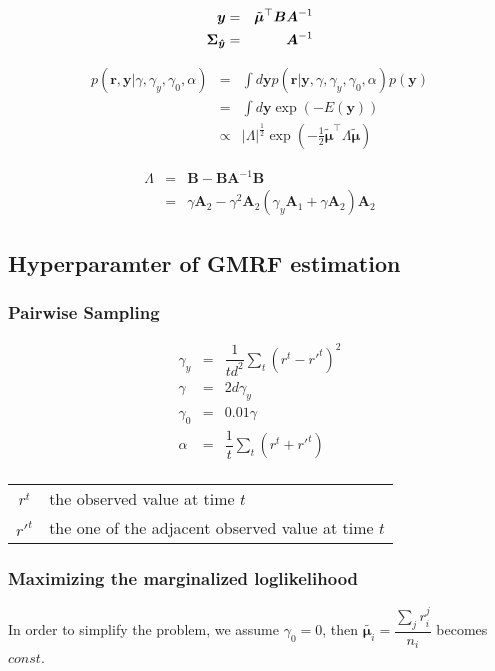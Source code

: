 \documentclass[platex, a4paper]{jsarticle}
\begin{document}
\begin{eqnarray}
  \bm{y} &=& \tilde{\bm{\mu}}^{\top}\bm{B} \bm{A}^{-1} \\
  \bm{\Sigma_{\hat{y}}} &=& \bm{A}^{-1}
\end{eqnarray}

\begin{eqnarray}
  p( \bm{r}, \bm{y} | \gamma, \gamma_y, \gamma_0, \alpha)
    &=& \int d\bm{y}  p( \bm{r}|\bm{y}, \gamma, \gamma_y, \gamma_0, \alpha ) p(\bm{y} ) \\
    &=&  \int d\bm{y}  \exp\left(- E(\bm{y} ) \right) \\
    &\propto& |\Lambda|^{\frac{1}{2}}  \exp\left( - \frac{1}{2} \tilde{\bm{\mu}}^\top \Lambda \tilde{\bm{\mu}}\right)
\end{eqnarray}

\begin{eqnarray}
  \Lambda &=& \bm{B} - \bm{B} \bm{A}^{-1} \bm{B}\\
           &=& \gamma \bm{A}_2 - \gamma^2 \bm{A}_2 (\gamma_y \bm{A}_1 + \gamma \bm{A}_2) \bm{A}_2
\end{eqnarray}


\subsection{Hyperparamter of GMRF estimation}
\subsubsection{Pairwise Sampling}
\begin{eqnarray*}
\gamma_y &=& \dfrac{1}{td^2} \sum_t (r^t - {r'}^t)^2 \\
\gamma &=& 2d\gamma_y \\
\gamma_0 &=& 0.01 \gamma \\
\alpha &=& \dfrac{1}{t} \sum_t (r^t + {r'}^t) \\
\end{eqnarray*}

\begin{table}[htb]
\begin{tabular}{cl}
${r}^t$&the observed value at time $t$ \\
${r'}^t$&the one of the adjacent observed value at time $t$\\
\end{tabular}
\end{table}

\subsubsection{Maximizing the marginalized loglikelihood}
In order to simplify the problem,
we assume $\gamma_0=0$, then $\tilde{\bm{\mu}_i} = \dfrac {\sum _{j}r_{i}^{j}} {n_{i}}$ becomes $const$.
\end{document}
